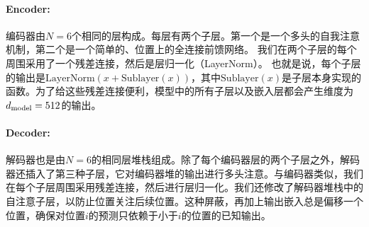 \paragraph{Encoder:} 编码器由$N=6$个相同的层构成。每层有两个子层。第一个是一个多头的自我注意机制，第二个是一个简单的、位置上的全连接前馈网络。  我们在两个子层的每个周围采用了一个残差连接\citep{he2016deep}，然后是层归一化（LayerNorm）\cite{layernorm2016}。 也就是说，每个子层的输出是$\mathrm{LayerNorm}(x + \mathrm{Sublayer}(x))$，其中$\mathrm{Sublayer}(x)$是子层本身实现的函数。为了给这些残差连接便利，模型中的所有子层以及嵌入层都会产生维度为$d_{\text{model}}=512$的输出。


\paragraph{Decoder:} 解码器也是由$N=6$的相同层堆栈组成。除了每个编码器层的两个子层之外，解码器还插入了第三种子层，它对编码器堆的输出进行多头注意。与编码器类似，我们在每个子层周围采用残差连接，然后进行层归一化。我们还修改了解码器堆栈中的自注意子层，以防止位置关注后续位置。这种屏蔽，再加上输出嵌入总是偏移一个位置，确保对位置$i$的预测只依赖于小于$i$的位置的已知输出。


